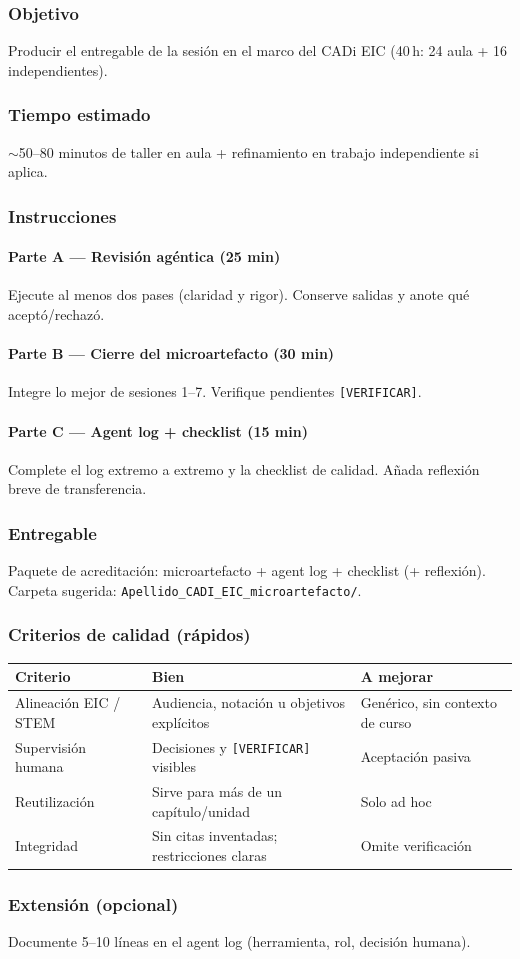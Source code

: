 \subsubsection*{Objetivo}
Producir el entregable de la sesión en el marco del CADi EIC (40\,h: 24 aula + 16 independientes).

\subsubsection*{Tiempo estimado}
$\sim$50--80 minutos de taller en aula + refinamiento en trabajo independiente si aplica.

\subsubsection*{Instrucciones}
\paragraph{Parte A --- Revisión agéntica (25 min)} Ejecute al menos dos pases (claridad y rigor). Conserve salidas y anote qué aceptó/rechazó.
\paragraph{Parte B --- Cierre del microartefacto (30 min)} Integre lo mejor de sesiones 1--7. Verifique pendientes \texttt{[VERIFICAR]}.
\paragraph{Parte C --- Agent log + checklist (15 min)} Complete el log extremo a extremo y la checklist de calidad. Añada reflexión breve de transferencia.

\subsubsection*{Entregable}
Paquete de acreditación: microartefacto + agent log + checklist (+ reflexión). Carpeta sugerida: \texttt{Apellido\_CADI\_EIC\_microartefacto/}.

\subsubsection*{Criterios de calidad (rápidos)}
\begin{tabularx}{\textwidth}{@{}lXX@{}}
\toprule
Criterio & Bien & A mejorar \\
\midrule
Alineación EIC / STEM & Audiencia, notación u objetivos explícitos & Genérico, sin contexto de curso \\
Supervisión humana & Decisiones y \texttt{[VERIFICAR]} visibles & Aceptación pasiva \\
Reutilización & Sirve para más de un capítulo/unidad & Solo ad hoc \\
Integridad & Sin citas inventadas; restricciones claras & Omite verificación \\
\bottomrule
\end{tabularx}

\subsubsection*{Extensión (opcional)}
Documente 5--10 líneas en el agent log (herramienta, rol, decisión humana).
